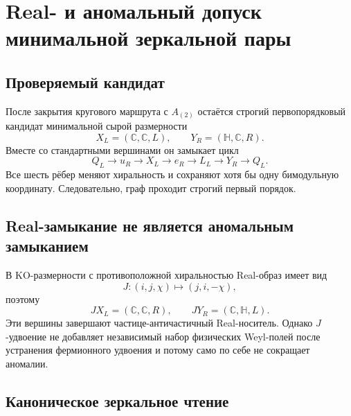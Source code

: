 \chapter{Real- и аномальный допуск минимальной зеркальной пары}
\label{ch:v7-minimal-mirror-pair-real-anomaly-gate}

\section{Проверяемый кандидат}

После закрытия кругового маршрута с $A_{(2)}$ остаётся строгий
первопорядковый кандидат минимальной сырой размерности
\begin{equation}
 X_L=(\mathbb C,\mathbb C,L),\qquad
 Y_R=(\mathbb H,\mathbb C,R).
 \label{eq:v7-mirror-pair-candidate}
\end{equation}
Вместе со стандартными вершинами он замыкает цикл
\begin{equation}
 Q_L\to u_R\to X_L\to e_R\to L_L\to Y_R\to Q_L.
 \label{eq:v7-mirror-pair-cycle}
\end{equation}
Все шесть рёбер меняют хиральность и сохраняют хотя бы одну бимодульную
координату. Следовательно, граф проходит строгий первый порядок.

\section{Real-замыкание не является аномальным замыканием}

В KO-размерности с противоположной хиральностью Real-образ имеет вид
\begin{equation}
 J:(i,j,\chi)\longmapsto(j,i,-\chi),
 \label{eq:v7-mirror-pair-real-map}
\end{equation}
поэтому
\begin{equation}
 JX_L=(\mathbb C,\mathbb C,R),\qquad
 JY_R=(\mathbb C,\mathbb H,L).
 \label{eq:v7-mirror-pair-real-images}
\end{equation}
Эти вершины завершают частице-античастичный Real-носитель. Однако
$J$-удвоение не добавляет независимый набор физических Weyl-полей после
устранения фермионного удвоения и потому само по себе не сокращает аномалии.

\section{Каноническое зеркальное чтение}

